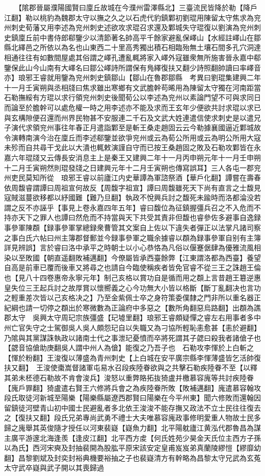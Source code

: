 　　【隂郡晉屬濮陽國賢曰廩丘故城在今濮州雷澤縣北】三臺流民皆降於勒【降戶江翻】勒以桃豹為魏郡太守以撫之久之以石虎代豹鎮鄴初劉琨用陳留太守焦求為兖州刺史荀藩又用李述為兖州刺史述欲攻求琨召求還及鄴城失守琨復以劉演為兖州刺史鎮廩丘前中書侍郎郗鑒少以清節著名帥高平千餘家避亂保嶧山【水經註嶧山在鄒縣北繹邑之所依以為名也山東西二十里高秀獨出積石相臨殆無土壤石間多孔穴洞達相通往往有如數間屋處其俗謂之嶧孔遭亂輒將家入嶧外寇雖衆無所施害晉永嘉中郗鑒保此山今山南有大嶧名曰鄒公嶧詩所謂保有鳬繹復扶又翻少詩照翻帥讀曰率嶧音亦】琅邪王睿就用鑒為兖州刺史鎮鄒山【鄒山在魯郡鄒縣　考異曰劉琨集建興二年十一月壬寅朔與丞相牋曰焦求雖出寒鄉有文武膽幹苟晞用為陳留太守獨在河南距當石勒撫綏有方琨以求行領兖州刺史後聞荀公以李述為兖州以素論門望不可與求同日而論至於膽幹可以處危權一時之用李述亦不能及求而王玄年少便欲共討求琨以求已與玄構隙便召還而州界民物甚不安服連二千石及文武大姓連遣信使求刺史是以遣兄子演代求領兖州事往年春正月遣詣鄴至是斬王桑走趙固云云今勒據襄國逼近鄴城故令演轉南演今治在廩丘而李述郗鑒並欲爭兖州或云為荀公所用或云為明公所用大寇未殄而自共尋干戈此以大潰也輒敕演謹自守而已按王桑趙固之敗及石勒攻鄴皆在永嘉六年琨牋又云傳長安消息主上是秦王又建興二年十一月丙申朔元年十一月壬申朔十二月壬寅朔然則琨發牋之日建興元年十二月壬寅朔也傳寫誤耳】三人各屯一郡兖州吏民莫知所從　琅邪王睿以前廬江内史華譚為軍諮祭酒【華戶化翻】譚嘗在壽春依周馥睿謂譚曰周祖宣何故反【周馥字祖宣】譚曰周馥雖死天下尚有直言之士馥見寇賊滋蔓欲移都以紓國難【難乃旦翻】執政不悅興兵討之馥死未踰時而洛都淪没若謂之反不亦誣乎【事見上卷永嘉四年五年】睿曰馥位為征鎮握彊兵召之不入危而不持亦天下之罪人也譚曰然危而不持當與天下共受其責非但馥也睿參佐多避事自逸録事參軍陳頵【録事參軍掌總録衆曹管其文案自上佐以下違失者彈正以法掌凡諸司察之事白氏六帖曰州主簿郡督郵並今録事參軍之職余據睿以頵為録事參軍自别有主簿詳見辨誤】言於睿曰洛中承平之時朝士以小心恭恪為凡俗以偃蹇倨肆為優雅流風相染以至敗國【朝直遥翻敗補邁翻】今僚屬皆承西臺餘弊【江東謂洛都為西臺】養望自高是前車已覆而後車又將尋之也請自今臨使稱疾者皆免官睿不從三王之誅趙王倫也【見八十四卷惠帝永寧元年】制己亥格以賞功自是循而用之頵上言昔趙王簒逆惠皇失位三王起兵討之故厚賞以懷嚮義之心今功無大小皆以格斷【斷丁亂翻决也言功之輕重差次皆以己亥格决之】乃至金紫佩士卒之身符策委僕隸之門非所以重名器正紀綱也請一切停之頵出於寒微數為正論府中多惡之【數所角翻惡烏路翻】出頵為譙郡太守　吳興太守周玘宗族彊盛【玘墟里翻】琅邪王睿頗疑憚之睿左右用事者多中州亡官失守之士駕御吳人吳人頗怨玘自以失職又為刁協所輕恥恚愈甚【恚於避翻】乃隂與其黨謀誅執政以諸南士代之事泄玘憂憤而卒將死謂其子勰曰殺我者諸傖子也【勰音協傖助庚翻吳人謂中州人為傖】能復之乃吾子也　石勒攻李惲於上白斬之【惲於粉翻】王浚復以薄盛為青州刺史【上白城在安平廣宗縣李惲薄盛皆乞活帥復扶又翻】　王浚使棗嵩督諸軍屯易水召段疾陸眷欲與之共擊石勒疾陸眷不至【以釋其弟未柸德石勒故不肯會浚兵】浚怒以重弊賂拓抜猗盧并檄慕容廆等共討疾陸眷【廆戶罪翻】猗盧遣右賢王六修將兵會之為疾陸眷所敗【敗補邁翻】廆遣慕容翰攻段氏取徒河新城至陽樂【陽樂縣屬遼西郡賢曰陽樂在今平州東】聞六修敗而還翰因留鎮徒河壁青山初中國士民避亂者多北依王浚浚不能存撫又政法不立士民往往復去之【復扶又翻】段氏兄弟專尚武勇不禮士大夫唯慕容廆政事修明愛重人物故士民多歸之廆舉其英俊隨才授任以河東裴嶷【嶷魚力翻】北平陽躭廬江黄泓代郡魯昌為謀主廣平游邃北海逢羨【逢皮江翻】北平西方䖍【何氏姓苑少昊金天氏位主西方子孫以為氏】西河宋奭及封抽裴開為股肱平原宋該安定皇甫岌岌弟真蘭陵繆愷【繆靡幼翻】昌黎劉斌及封奕封裕典機要裕抽之子也裴嶷清方有幹略為昌黎太守兄武為玄菟太守武卒嶷與武子開以其喪歸過